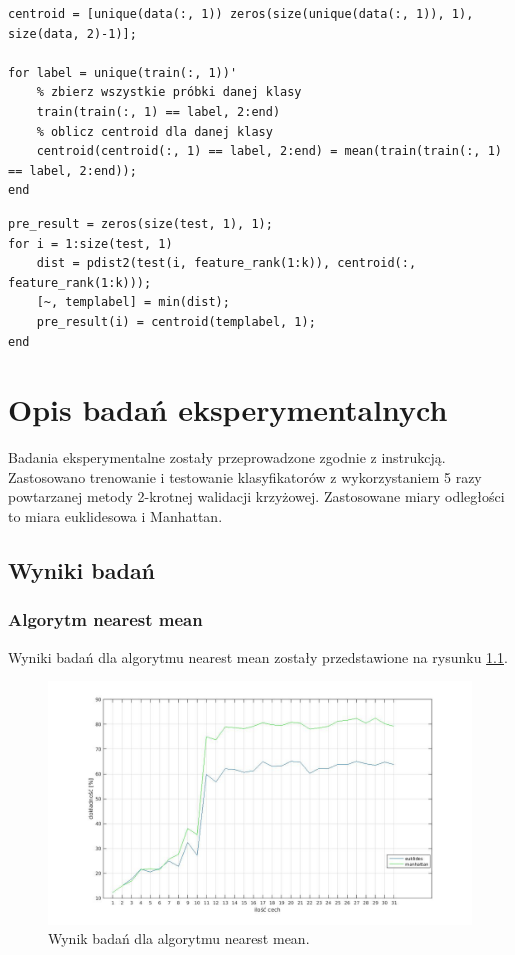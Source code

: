 \documentclass[11pt, a4paper, titlepage]{report}
\begin{document}
\begin{lstlisting}[label={lst:centroidy},caption={Etap treningu - wyznaczanie centroidów.}]
centroid = [unique(data(:, 1)) zeros(size(unique(data(:, 1)), 1), size(data, 2)-1)];

for label = unique(train(:, 1))'
    % zbierz wszystkie próbki danej klasy
    train(train(:, 1) == label, 2:end)
    % oblicz centroid dla danej klasy
    centroid(centroid(:, 1) == label, 2:end) = mean(train(train(:, 1) == label, 2:end));
end
\end{lstlisting}

\begin{lstlisting}[label={lst:pre_result},caption={Wyznaczenie odległości próbki od centroida i przydzielenie do klasy.}]
pre_result = zeros(size(test, 1), 1);
for i = 1:size(test, 1)
    dist = pdist2(test(i, feature_rank(1:k)), centroid(:, feature_rank(1:k)));
    [~, templabel] = min(dist);
    pre_result(i) = centroid(templabel, 1);
end
\end{lstlisting}

\chapter{Opis badań eksperymentalnych}
\label{chap:Opis badań eksperymentalnych}
Badania eksperymentalne zostały przeprowadzone zgodnie z instrukcją. Zastosowano trenowanie i testowanie klasyfikatorów z wykorzystaniem 5 razy powtarzanej metody 2-krotnej walidacji krzyżowej. Zastosowane miary odległości to miara euklidesowa i Manhattan.
\section{Wyniki badań}
\label{chap:Wyniki badań}
\subsection{Algorytm nearest mean}
\label{subs:Algorytm nearest mean}
Wyniki badań dla algorytmu nearest mean zostały przedstawione na rysunku \ref{fig:nm_res}.

\begin{figure}[h]
  \centering
  \label{fig:nm_res}
  \includegraphics[scale=0.4]{obrazki/nm_plot}
  \caption{Wynik badań dla algorytmu nearest mean.}
\end{figure}
\end{document}

